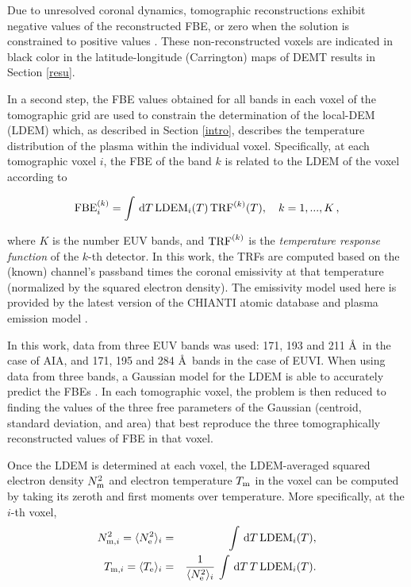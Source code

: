 \documentclass[namedreferences]{solarphysics}
\newcommand{\LDEM}{{\rm LDEM}}
\newcommand{\FBE}{{\rm FBE}}
\newcommand{\TRF}{{\rm TRF}}
\newcommand{\Te}{T_{\rm e}}
\newcommand{\Tm}{T_{\rm m}}
\newcommand{\Tmi}{T_{{\rm m},i}}
\newcommand{\Ne}{N_{\rm e}}
\newcommand{\Nm}{N_{\rm m}}
\newcommand{\Nsqmi}{N^2_{{\rm m},i}}
\begin{document}
\begin{article}
Due to unresolved coronal dynamics, tomographic reconstructions exhibit negative values of the reconstructed FBE, or zero when the solution is constrained to positive values \citep{frazin_2000,frazin_2009}. These non-reconstructed voxels are indicated {in black color in the latitude-longitude (Carrington) maps of DEMT} results in Section \ref{resu}.

{In a second step, the FBE values obtained for all bands in each voxel {of the tomographic grid are used to constrain the determination of the local-DEM (LDEM) which, as described in Section \ref{intro}, describes the temperature distribution of the plasma within the individual voxel.} Specifically, at each tomographic voxel $i$, the FBE of the band $k$ is related to the LDEM of the voxel according to}

\begin{equation}\label{fbeldem}
\FBE_i^{(k)}  = \int\,\textrm{d}T\,\LDEM_i(T)\,{\TRF}^{(k)}(T), \ \ \ {k=1,...,K} \,,
\end{equation}

\noindent
{where $K$ is the number EUV bands, and $\TRF^{(k)}$ is the \emph{temperature response function} of the $k$-th detector. In this work, the TRFs are computed based on the (known) channel’s passband times the coronal emissivity at that temperature (normalized by the squared electron density). The emissivity model used here is provided by the latest version of the CHIANTI atomic database and plasma emission model \citep{delzanna_2015,landi_2013}.}

{In this work,} data from three EUV bands {was used:} 171, 193 and {211 \AA\ in} {the} case of AIA, and 171, 195 and {284 \AA\ bands} in {the} case of EUVI. When using data from {three bands}, a Gaussian model for the LDEM is able to accurately predict {the FBEs \citep{nuevo_2015}}. In each tomographic voxel, the problem is then reduced to finding the values of the three free parameters of the Gaussian (centroid, standard deviation, and area) that best reproduce the three tomographically reconstructed values of FBE in that voxel.

Once the LDEM is determined at each voxel, {the LDEM-averaged squared electron density $\Nm^2$ and electron temperature $\Tm$} in the voxel can be computed by taking its zeroth and first moments over temperature. More specifically, at the $i$-th voxel,
{
\begin{eqnarray}\label{momento1}
 \Nsqmi = \langle \Ne^2 \rangle_i &=& \int\,\textrm{d}T\,\LDEM_i(T),\label{Ne} \\ 
\label{momento2}
 \Tmi  = \langle \Te \rangle_i &=& \frac{1}{\langle \Ne^2 \rangle_i}\,\int\,\textrm{d}T\,T\,\LDEM_i(T).\label{Tm} 
\end{eqnarray}
}


\end{article}
\end{document}
